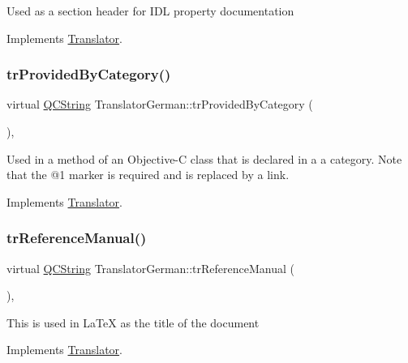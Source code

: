 Used as a section header for I\+DL property documentation 

Implements \mbox{\hyperlink{class_translator}{Translator}}.

\mbox{\label{class_translator_german_a3b0f0724e19d5adca9edd52fff79f341}} 
\subsubsection{\texorpdfstring{trProvidedByCategory()}{trProvidedByCategory()}}
{\footnotesize\ttfamily virtual \mbox{\hyperlink{class_q_c_string}{Q\+C\+String}} Translator\+German\+::tr\+Provided\+By\+Category (\begin{DoxyParamCaption}{ }\end{DoxyParamCaption})\hspace{0.3cm}{\ttfamily [inline]}, {\ttfamily [virtual]}}

Used in a method of an Objective-\/C class that is declared in a a category. Note that the @1 marker is required and is replaced by a link. 

Implements \mbox{\hyperlink{class_translator}{Translator}}.

\mbox{\label{class_translator_german_a2d95d94c7b4c7f58b0c9c10d057263d9}} 
\subsubsection{\texorpdfstring{trReferenceManual()}{trReferenceManual()}}
{\footnotesize\ttfamily virtual \mbox{\hyperlink{class_q_c_string}{Q\+C\+String}} Translator\+German\+::tr\+Reference\+Manual (\begin{DoxyParamCaption}{ }\end{DoxyParamCaption})\hspace{0.3cm}{\ttfamily [inline]}, {\ttfamily [virtual]}}

This is used in La\+TeX as the title of the document 

Implements \mbox{\hyperlink{class_translator}{Translator}}.

\mbox{\label{class_translator_german_afa0c2c427bb4da28b214853d71ce3e7f}} 
